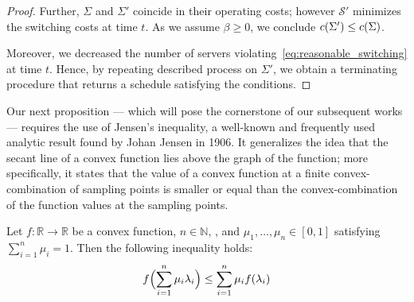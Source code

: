 \begin{proof}
Further, $\Sigma$ and $\Sigma'$ coincide in their operating costs; however $\mathcal{S}'$ minimizes the switching costs at time $t$. As we assume $\beta\ge0$, we conclude $c(\Sigma')\le c(\Sigma)$.

Moreover, we decreased the number of servers violating~\eqref{eq:reasonable_switching} at time $t$. Hence, by repeating described process on $\Sigma'$, we obtain a terminating procedure that returns a schedule satisfying the conditions.
\end{proof}

Our next proposition --- which will pose the cornerstone of our subsequent works --- requires the use of Jensen's inequality, a well-known and frequently used analytic result found by Johan Jensen in 1906. It generalizes the idea that the secant line of a convex function lies above the graph of the function; more specifically, it states that the value of a convex function at a finite convex-combination of sampling points is smaller or equal than the convex-combination of the function values at the sampling points.
\begin{lem}\label{lem:jensens-inequality}
Let $f:\mathbb{R}\rightarrow\mathbb{R}$ be a convex function, $n\in\mathbb{N}$, , and $\mu_1,\ldots,\mu_n\in[0,1]$ satisfying $\sum\limits_{i=1}^{n}\mu_i=1$. Then the following inequality holds:
\begin{equation*}
	f\Bigl(\sum_{i=1}^n \mu_i \lambda_i\Bigr) \leq \sum_{i=1}^n \mu_i f(\lambda_i)
\end{equation*}
\end{lem}
